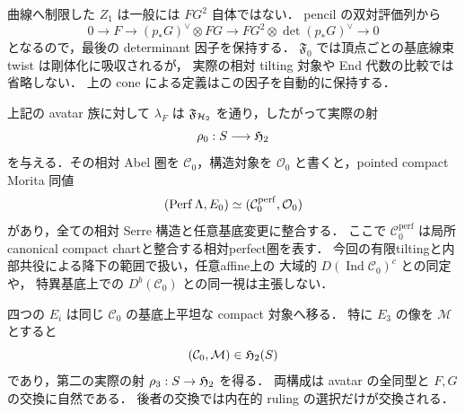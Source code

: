 \begin{remark}[相対determinant因子]
曲線へ制限した $Z_1$ は一般には $FG^2$ 自体ではない．
pencil の双対評価列から
\[
 0\to F\to(p_*G)^\vee\otimes FG
   \to FG^2\otimes\det(p_*G)^\vee\to0
\]
となるので，最後の determinant 因子を保持する．
$\mathfrak F_0$ では頂点ごとの基底線束 twist は剛体化に吸収されるが，
実際の相対 tilting 対象や End 代数の比較では省略しない．
上の cone による定義はこの因子を自動的に保持する．
\end{remark}

\begin{theorem}[一般square族の相対$E_0$・$E_3$認識]
\label{thm:qa-relative-square-e0-e3-h2}
上記の avatar 族に対して $\lambda_F$ は
$\mathfrak F_{\mathcal H_2}$ を通り，したがって実際の射
\[
 \rho_0:S\longrightarrow\mathfrak H_2
\]
を与える．その相対 Abel 圏を $\mathcal C_0$，構造対象を
$\mathcal O_0$ と書くと，pointed compact Morita 同値
\[
 (\operatorname{Perf}\Lambda,E_0)\simeq(\mathcal C_0^{\mathrm{perf}},\mathcal O_0)
\]
があり，全ての相対 Serre 構造と任意基底変更に整合する．
ここで $\mathcal C_0^{\mathrm{perf}}$ は局所canonical compact chartと整合する相対perfect圏を表す．
今回の有限tiltingと内部共役による降下の範囲で扱い，任意affine上の
大域的 $D(\operatorname{Ind}\mathcal C_0)^c$ との同定や，
特異基底上での $D^b(\mathcal C_0)$ との同一視は主張しない．

四つの $E_i$ は同じ $\mathcal C_0$ の基底上平坦な compact 対象へ移る．
特に $E_3$ の像を $\mathcal M$ とすると
\[
 (\mathcal C_0,\mathcal M)\in\mathfrak H_2(S)
\]
であり，第二の実際の射 $\rho_3:S\to\mathfrak H_2$ を得る．
両構成は avatar の全同型と $F,G$ の交換に自然である．
後者の交換では内在的 ruling の選択だけが交換される．
\end{theorem}
